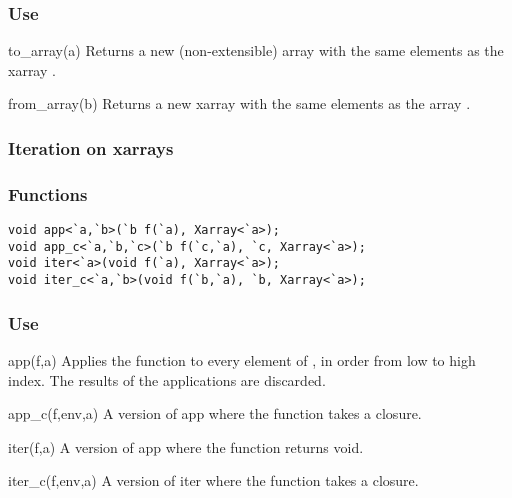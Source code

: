 \subsubsection*{Use}

\begin{defun}{to_array}{(a)}
Returns a new (non-extensible) array with the same elements as the
xarray .
\end{defun}

\begin{defun}{from_array}{(b)}
Returns a new xarray with the same elements as the array .
\end{defun}

\subsubsection*{Iteration on xarrays}
\subsubsection*{Functions}
\begin{verbatim}
void app<`a,`b>(`b f(`a), Xarray<`a>);
void app_c<`a,`b,`c>(`b f(`c,`a), `c, Xarray<`a>);
void iter<`a>(void f(`a), Xarray<`a>);
void iter_c<`a,`b>(void f(`b,`a), `b, Xarray<`a>);
\end{verbatim}

\subsubsection*{Use}

\begin{defun}{app}{(f,a)}
Applies the function  to every element of , in order from
low to high index.  The results of the applications are discarded.
\end{defun}

\begin{defun}{app_c}{(f,env,a)}
A version of app where the function  takes a closure.
\end{defun}

\begin{defun}{iter}{(f,a)}
A version of app where the function  returns void.
\end{defun}

\begin{defun}{iter_c}{(f,env,a)}
A version of iter where the function  takes a closure.
\end{defun}

